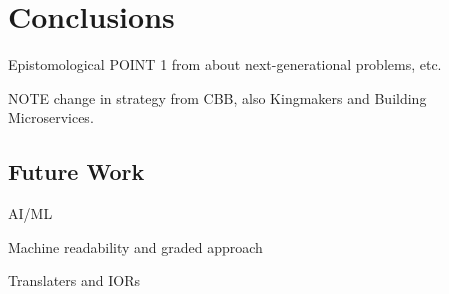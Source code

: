 \chapter{Conclusions}\label{ch:conclusions}

Epistomological
POINT 1 from about next-generational problems, etc.

NOTE change in strategy from CBB, also Kingmakers and Building Microservices.


\section{Future Work}

AI/ML

Machine readability and graded approach

Translaters and IORs


\listoftodos